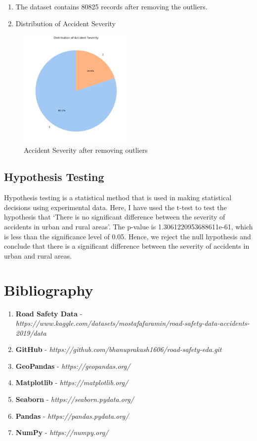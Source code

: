 \documentclass{article}
\begin{document}
\begin{enumerate}
  \item The dataset contains 80825 records after removing the outliers.
  \item Distribution of Accident Severity
\end{enumerate}

\begin{figure}[ht]
  \centering
  \includegraphics[width=0.5\textwidth]{Images/accident_severity_without_outliers.png}
  \caption{Accident Severity after removing outliers}
\end{figure}

\subsection{Hypothesis Testing}
Hypothesis testing is a statistical method that is used in making statistical decisions using experimental data.
Here, I have used the t-test to test the hypothesis that `There is no significant difference between the severity
of accidents in urban and rural areas'. The p-value is 1.3061220953688611e-61, which is less than the
significance level of 0.05. Hence, we reject the null hypothesis and conclude that there is a significant
difference between the severity of accidents in urban and rural areas.

\section{Bibliography}
\begin{enumerate}
  \item \textbf{Road Safety Data} - \textit{https://www.kaggle.com/datasets/mostafafaramin/road-safety-data-accidents-2019/data}
  \item \textbf{GitHub} - \textit{https://github.com/bhanuprakash1606/road-safety-eda.git}
  \item \textbf{GeoPandas} - \textit{https://geopandas.org/}
  \item \textbf{Matplotlib} - \textit{https://matplotlib.org/}
  \item \textbf{Seaborn} - \textit{https://seaborn.pydata.org/}
  \item \textbf{Pandas} - \textit{https://pandas.pydata.org/}
  \item \textbf{NumPy} - \textit{https://numpy.org/}
\end{enumerate}
\end{document}
